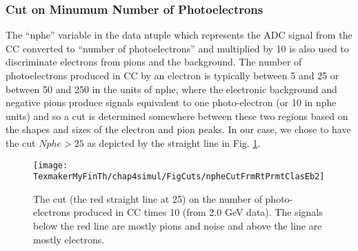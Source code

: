 \subsubsection{Cut on Minumum Number of Photoelectrons}
\label{nphCut} 
The ``nphe'' variable in the data ntuple which represents the ADC signal from the CC converted to ``number of photoelectrons'' and multiplied by 10 is also used %
to discriminate electrons from pions and %
the background. %
The number of photoelectrons produced in CC by an electron  is typically between 5 and 25 or between 50 and 250 in the units of nphe, where the electronic background and negative pions produce signals equivalent to one photo-electron (or 10 in nphe units) and so a cut is determined somewhere between these two regions based on the shapes and sizes of the electron and pion peaks. In our case, we chose to have the cut $Nphe > 25$ as depicted by the straight line in Fig. \ref{npheCt}.

\begin{figure}[] %
\centering
\leavevmode \texttt{[image: TexmakerMyFinTh/chap4simul/FigCuts/npheCutFrmRtPrmtClasEb2]}  %
\caption[CC-photoelectron number cut]{The cut (the red straight line at 25) on the number of photo-electrons produced in CC times 10 (from 2.0 GeV data). The signals below the red line are mostly pions and noise and above the line are mostly electrons.
}
\label{npheCt}
\end{figure}
